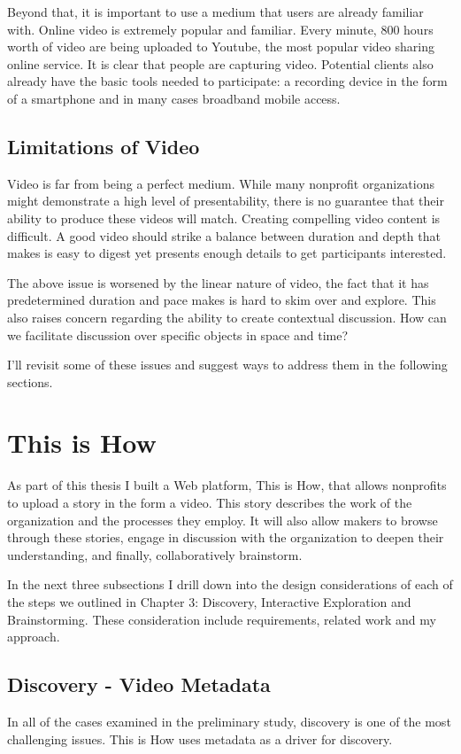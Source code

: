 Beyond that, it is important to use a medium that users are already familiar with. Online video is extremely popular and familiar. Every minute, 800 hours worth of video are being uploaded to Youtube, the most popular video sharing online service. It is clear that people are capturing video. Potential clients also already have the basic tools needed to participate: a recording device in the form of a smartphone and in many cases broadband mobile access. 

\subsection{Limitations of Video} 

Video is far from being a perfect medium. While many nonprofit organizations might demonstrate a high level of presentability, there is no guarantee that their ability to produce these videos will match. Creating compelling video content is difficult. A good video should strike a balance between duration and depth that makes is easy to digest yet presents enough details to get participants interested. 

The above issue is worsened by the linear nature of video, the fact that it has predetermined duration and pace makes is hard to skim over and explore. This also raises concern regarding the ability to create contextual discussion. How can we facilitate discussion over specific objects in space and time?

I'll revisit some of these issues and suggest ways to address them in the following sections.

\section{This is How}

As part of this thesis I built a Web platform, This is How, that allows nonprofits to upload a story in the form a video. This story describes the work of the organization and the processes they employ. It will also allow makers to browse through these stories, engage in discussion with the organization to deepen their understanding, and finally, collaboratively brainstorm. 

In the next three subsections I drill down into the design considerations of each of the steps we outlined in Chapter 3: Discovery, Interactive Exploration and Brainstorming. These consideration include requirements, related work and my approach. 

\subsection{Discovery - Video Metadata}
In all of the cases examined in the preliminary study, discovery is one of the most challenging issues. This is How uses metadata as a driver for discovery. 

